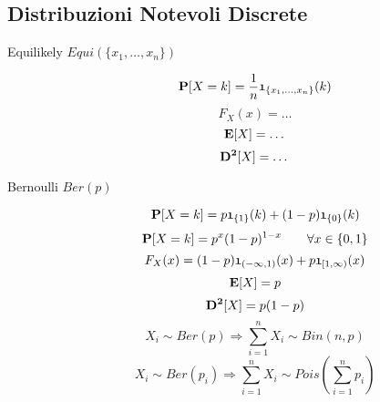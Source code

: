 \subsection{Distribuzioni Notevoli Discrete}
\begin{description}
	
	\item[Equilikely $Equi(\{x_{1},\dots,x_{n}\})$]
		\begin{equation}
		\mathbf{P}[X=k]=\frac{1}{n}\mathfrak{1}_{\{x_{1},\dots,x_{n}\}}(k)
		\end{equation}
		\begin{equation}
		F_{X}(x)=\dots
		\end{equation}
		\begin{equation}
		\mathbf{E}[X]=\dots
		\end{equation}
		\begin{equation}
		\mathbf{D^{2}}[X]=\dots
		\end{equation}
	
	\item[Bernoulli $Ber(p)$]
		\begin{equation}
		\mathbf{P}[X=k] = p\mathfrak{1}_{\{1\}}(k)+(1-p)\mathfrak{1}_{\{0\}}(k)
		\end{equation}
		\begin{equation}
		\mathbf{P}[X=k]=p^{x}(1-p)^{1-x}
		\qquad\forall x\in\{0,1\}
		\end{equation}
		\begin{equation}
		F_{X}(x)=(1-p)\mathfrak{1}_{(-\infty,1)}(x)+p\mathfrak{1}_{[1,\infty)}(x)
		\end{equation}
		\begin{equation}
		\mathbf{E}[X]=p
		\end{equation}
		\begin{equation}
		\mathbf{D^{2}}[X]=p(1-p)
		\end{equation}
		\begin{equation}
		X_{i}\sim Ber(p) \Rightarrow \sum_{i=1}^{n}X_{i}\sim Bin(n,p)
		\end{equation}
		\begin{equation}
		X_{i}\sim Ber(p_{i}) \Rightarrow \sum_{i=1}^{n}X_{i}\sim Pois(\sum_{i=1}^{n}p_{i})
		\end{equation}
	

\end{description}
